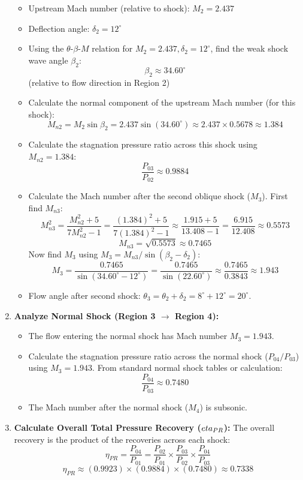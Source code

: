\begin{enumerate}
  \begin{itemize}
  \tightlist
  \item
    Upstream Mach number (relative to shock): \(M_2 = 2.437\)
  \item
    Deflection angle: \(\delta_2 = 12^\circ\)
  \item
    Using the \(\theta\)-\(\beta\)-\(M\) relation for
    \(M_2=2.437, \delta_2=12^\circ\), find the weak shock wave angle
    \(\beta_2\): \[ \beta_2 \approx 34.60^\circ \] (relative to flow
    direction in Region 2)
  \item
    Calculate the normal component of the upstream Mach number (for this
    shock):
    \[ M_{n2} = M_2 \sin\beta_2 = 2.437 \sin(34.60^\circ) \approx 2.437 \times 0.5678 \approx 1.384 \]
  \item
    Calculate the stagnation pressure ratio across this shock using
    \(M_{n2}=1.384\): \[ \frac{P_{03}}{P_{02}} \approx 0.9884 \]
  \item
    Calculate the Mach number after the second oblique shock (\(M_3\)).
    First find \(M_{n3}\):
    \[ M_{n3}^2 = \frac{M_{n2}^2 + 5}{7M_{n2}^2 - 1} = \frac{(1.384)^2 + 5}{7(1.384)^2 - 1} \approx \frac{1.915 + 5}{13.408 - 1} = \frac{6.915}{12.408} \approx 0.5573 \]
    \[ M_{n3} = \sqrt{0.5573} \approx 0.7465 \] Now find \(M_3\) using
    \(M_3 = M_{n3} / \sin(\beta_2 - \delta_2)\):
    \[ M_3 = \frac{0.7465}{\sin(34.60^\circ - 12^\circ)} = \frac{0.7465}{\sin(22.60^\circ)} \approx \frac{0.7465}{0.3843} \approx 1.943 \]
  \item
    Flow angle after second shock:
    \(\theta_3 = \theta_2 + \delta_2 = 8^\circ + 12^\circ = 20^\circ\).
  \end{itemize}
\item
  \textbf{Analyze Normal Shock (Region 3 \(\to\) Region 4):}

  \begin{itemize}
  \tightlist
  \item
    The flow entering the normal shock has Mach number \(M_3 = 1.943\).
  \item
    Calculate the stagnation pressure ratio across the normal shock
    (\(P_{04}/P_{03}\)) using \(M_3=1.943\). From standard normal shock
    tables or calculation: \[ \frac{P_{04}}{P_{03}} \approx 0.7480 \]
  \item
    The Mach number after the normal shock (\(M_4\)) is subsonic.
  \end{itemize}
\item
  \textbf{Calculate Overall Total Pressure Recovery (\(\\eta_{PR}\)):}
  The overall recovery is the product of the recoveries across each
  shock:
  \[ \eta_{PR} = \frac{P_{04}}{P_{01}} = \frac{P_{02}}{P_{01}} \times \frac{P_{03}}{P_{02}} \times \frac{P_{04}}{P_{03}} \]
  \[ \eta_{PR} \approx (0.9923) \times (0.9884) \times (0.7480) \approx 0.7338 \]
\end{enumerate}

